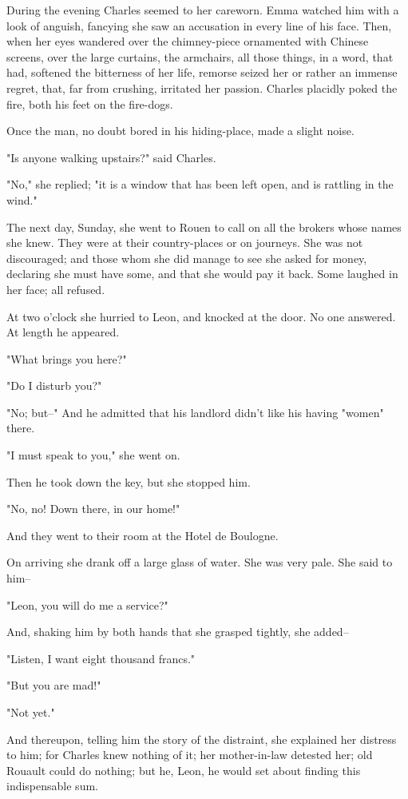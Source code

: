 \documentclass{tufte-book}
\begin{document}
During the evening Charles seemed to her careworn. Emma watched him with
a look of anguish, fancying she saw an accusation in every line of his
face. Then, when her eyes wandered over the chimney-piece ornamented
with Chinese screens, over the large curtains, the armchairs, all
those things, in a word, that had, softened the bitterness of her life,
remorse seized her or rather an immense regret, that, far from crushing,
irritated her passion. Charles placidly poked the fire, both his feet on
the fire-dogs.

Once the man, no doubt bored in his hiding-place, made a slight noise.

"Is anyone walking upstairs?" said Charles.

"No," she replied; "it is a window that has been left open, and is
rattling in the wind."

The next day, Sunday, she went to Rouen to call on all the brokers whose
names she knew. They were at their country-places or on journeys. She
was not discouraged; and those whom she did manage to see she asked for
money, declaring she must have some, and that she would pay it back.
Some laughed in her face; all refused.

At two o'clock she hurried to Leon, and knocked at the door. No one
answered. At length he appeared.

"What brings you here?"

"Do I disturb you?"

"No; but--" And he admitted that his landlord didn't like his having
"women" there.

"I must speak to you," she went on.

Then he took down the key, but she stopped him.

"No, no! Down there, in our home!"

And they went to their room at the Hotel de Boulogne.

On arriving she drank off a large glass of water. She was very pale. She
said to him--

"Leon, you will do me a service?"

And, shaking him by both hands that she grasped tightly, she added--

"Listen, I want eight thousand francs."

"But you are mad!"

"Not yet."

And thereupon, telling him the story of the distraint, she explained
her distress to him; for Charles knew nothing of it; her mother-in-law
detested her; old Rouault could do nothing; but he, Leon, he would set
about finding this indispensable sum.
\end{document}
